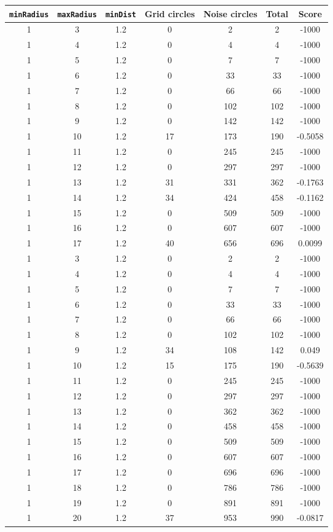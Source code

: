 \documentclass[letterpaper, 12pt]{article}
\begin{document}
\begin{longtable}{|c|c|c|c|c|c|c|}
\hline
\textbf{\texttt{minRadius}} & \textbf{\texttt{maxRadius}} & \textbf{\texttt{minDist}} & \textbf{Grid circles} & \textbf{Noise circles} & \textbf{Total} & \textbf{Score} \\
\hline
1 & 3 & 1.2 & 0 & 2 & 2 & -1000 \\
\hline
1 & 4 & 1.2 & 0 & 4 & 4 & -1000 \\
\hline
1 & 5 & 1.2 & 0 & 7 & 7 & -1000 \\
\hline
1 & 6 & 1.2 & 0 & 33 & 33 & -1000 \\
\hline
1 & 7 & 1.2 & 0 & 66 & 66 & -1000 \\
\hline
1 & 8 & 1.2 & 0 & 102 & 102 & -1000 \\
\hline
1 & 9 & 1.2 & 0 & 142 & 142 & -1000 \\
\hline
1 & 10 & 1.2 & 17 & 173 & 190 & -0.5058 \\
\hline
1 & 11 & 1.2 & 0 & 245 & 245 & -1000 \\
\hline
1 & 12 & 1.2 & 0 & 297 & 297 & -1000 \\
\hline
1 & 13 & 1.2 & 31 & 331 & 362 & -0.1763 \\
\hline
1 & 14 & 1.2 & 34 & 424 & 458 & -0.1162 \\
\hline
1 & 15 & 1.2 & 0 & 509 & 509 & -1000 \\
\hline
1 & 16 & 1.2 & 0 & 607 & 607 & -1000 \\
\hline
1 & 17 & 1.2 & 40 & 656 & 696 & 0.0099 \\
\hline
1 & 3 & 1.2 & 0 & 2 & 2 & -1000 \\
\hline
1 & 4 & 1.2 & 0 & 4 & 4 & -1000 \\
\hline
1 & 5 & 1.2 & 0 & 7 & 7 & -1000 \\
\hline
1 & 6 & 1.2 & 0 & 33 & 33 & -1000 \\
\hline
1 & 7 & 1.2 & 0 & 66 & 66 & -1000 \\
\hline
1 & 8 & 1.2 & 0 & 102 & 102 & -1000 \\
\hline
1 & 9 & 1.2 & 34 & 108 & 142 & 0.049 \\
\hline
1 & 10 & 1.2 & 15 & 175 & 190 & -0.5639 \\
\hline
1 & 11 & 1.2 & 0 & 245 & 245 & -1000 \\
\hline
1 & 12 & 1.2 & 0 & 297 & 297 & -1000 \\
\hline
1 & 13 & 1.2 & 0 & 362 & 362 & -1000 \\
\hline
1 & 14 & 1.2 & 0 & 458 & 458 & -1000 \\
\hline
1 & 15 & 1.2 & 0 & 509 & 509 & -1000 \\
\hline
1 & 16 & 1.2 & 0 & 607 & 607 & -1000 \\
\hline
1 & 17 & 1.2 & 0 & 696 & 696 & -1000 \\
\hline
1 & 18 & 1.2 & 0 & 786 & 786 & -1000 \\
\hline
1 & 19 & 1.2 & 0 & 891 & 891 & -1000 \\
\hline
1 & 20 & 1.2 & 37 & 953 & 990 & -0.0817 \\
\hline
\end{longtable}
\end{document}
